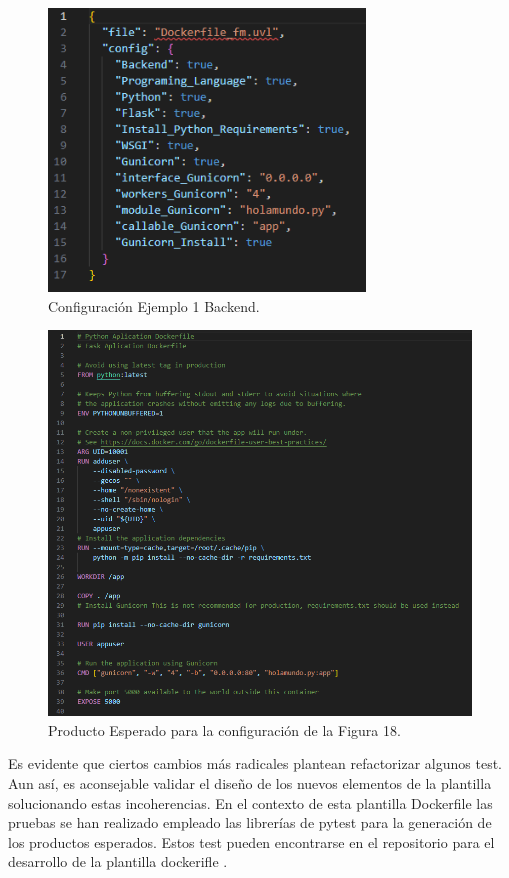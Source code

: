 \documentclass[12pt, a4paper, twoside]{article}
\begin{document}
\begin{figure}[h]
	\centering
	  \includegraphics[width=0.75\textwidth]{Dockerfile.configuracion-backend.png}
	\caption{Configuración Ejemplo 1 Backend.}
\end{figure}

\newpage 

\begin{figure}[h]
	\centering
	  \includegraphics[width=1\textwidth]{Dockerfile.backend.producto.png}
	\caption{Producto Esperado para la configuración de la Figura 18.}
\end{figure}

Es evidente que ciertos cambios más radicales plantean refactorizar algunos test. 
Aun así, es aconsejable validar el diseño de los nuevos elementos de la plantilla solucionando estas incoherencias.
En el contexto de esta plantilla Dockerfile las pruebas se han realizado empleado las librerías de pytest \cite{pytest_docs} para la generación de los productos esperados. Estos test pueden encontrarse en el repositorio para el desarrollo de la plantilla dockerifle \cite{dockerfile_template_dev}.
\end{document}
